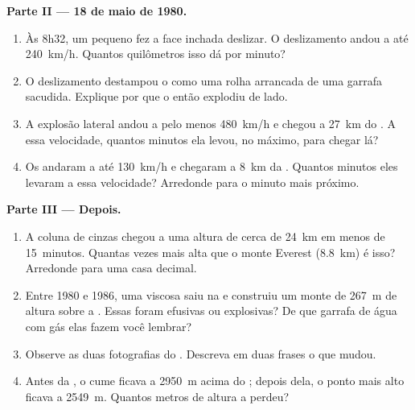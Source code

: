 \begin{problem}
\medskip
\noindent\textbf{Parte II --- 18 de maio de 1980.}\par\nopagebreak
\begin{enumerate}[resume, beginpenalty=10000]
  \item Às 8h32, um pequeno  fez a face inchada deslizar. O
        deslizamento andou a até \qty{240}{km/h}. Quantos quilômetros isso
        dá por minuto?
  \item O deslizamento destampou o  como uma rolha arrancada de uma
        garrafa sacudida. Explique por que o  então explodiu de lado.
  \item A explosão lateral andou a pelo menos \qty{480}{km/h} e chegou a
        \qty{27}{km} do . A essa velocidade, quantos minutos ela
        levou, no máximo, para chegar lá?
  \item Os  andaram a até \qty{130}{km/h} e chegaram a
        \qty{8}{km} da . Quantos minutos eles levaram a essa
        velocidade? Arredonde para o minuto mais próximo.
\end{enumerate}

\medskip
\noindent\textbf{Parte III --- Depois.}\par\nopagebreak
\begin{enumerate}[resume, beginpenalty=10000]
  \item A coluna de cinzas chegou a uma altura de cerca de \qty{24}{km} em
        menos de 15~minutos. Quantas vezes mais alta que o monte Everest
        (\qty{8.8}{km}) é isso? Arredonde para uma casa decimal.
  \item Entre 1980 e 1986, uma  viscosa saiu na  e construiu um
        monte de \qty{267}{m} de altura sobre a . Essas  foram
        efusivas ou explosivas? De que garrafa de água com gás elas fazem
        você lembrar?
  \item Observe as duas fotografias do . Descreva em duas frases o
        que mudou.
  \item Antes da , o cume ficava a \qty{2950}{m} acima do ; depois dela, o ponto mais alto ficava a \qty{2549}{m}. Quantos
        metros de altura a  perdeu?
\end{enumerate}
\end{problem}
